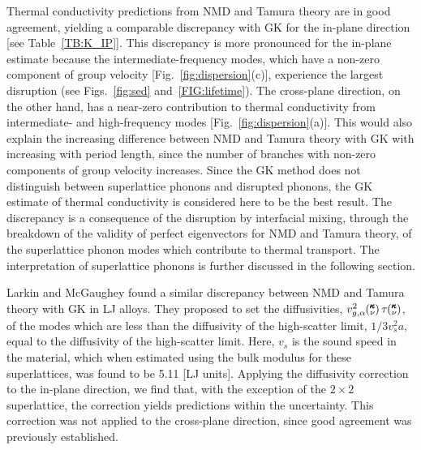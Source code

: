 \documentclass[aps,prb,preprint,preprintnumbers,amsmath,amssymb,floatfix,superscriptaddress]{revtex4}
\newcommand{\kv}{\mspace{-4.0mu}\left(\mspace{-8.0mu}
\begin{smallmatrix}&\pmb{\kappa} \\&\nu\end{smallmatrix}
\mspace{-3.0mu}\right)}
\begin{document}
Thermal conductivity predictions from NMD and Tamura theory are in good agreement, yielding a comparable discrepancy with GK for the in-plane direction [see Table~\ref{TB:K_IP}]. This discrepancy is more pronounced for the in-plane estimate because the intermediate-frequency modes, which have a non-zero component of group velocity [Fig.~\ref{fig:dispersion}(c)], experience the largest disruption (see Figs.~\ref{fig:sed} and~\ref{FIG:lifetime}). The cross-plane direction, on the other hand, has a near-zero contribution to thermal conductivity from intermediate- and high-frequency modes [Fig.~\ref{fig:dispersion}(a)]. This would also explain the increasing difference between NMD and Tamura theory with GK with increasing with period length, since the number of branches with non-zero components of group velocity increases. Since the GK method does not distinguish between superlattice phonons and disrupted phonons, the GK estimate of thermal conductivity is considered here to be the best result. The discrepancy is a consequence of the disruption by interfacial mixing, through the breakdown of the validity of perfect eigenvectors for NMD and Tamura theory, of the superlattice phonon modes which contribute to thermal transport. The interpretation of superlattice phonons is further discussed in the following section.

Larkin and McGaughey found a similar discrepancy between NMD and Tamura theory with GK in LJ alloys.\cite{jason2013vc} They proposed to set the diffusivities, $v^{2}_{g,\mathbf{\alpha}}\kv \tau\kv$, of the modes which are less than the diffusivity of the high-scatter limit, $1/3 v^2_sa $, equal to the diffusivity of the high-scatter limit. Here, $v_s$ is the sound speed in the material, which when estimated using the bulk modulus for these superlattices, was found to be 5.11 [LJ units].\cite{GULP}  Applying the diffusivity correction to the in-plane direction, we find that, with the exception of the $2 \times 2$ superlattice, the correction yields predictions within the uncertainty. This correction was not applied to the cross-plane direction, since good agreement was previously established.
\end{document}
